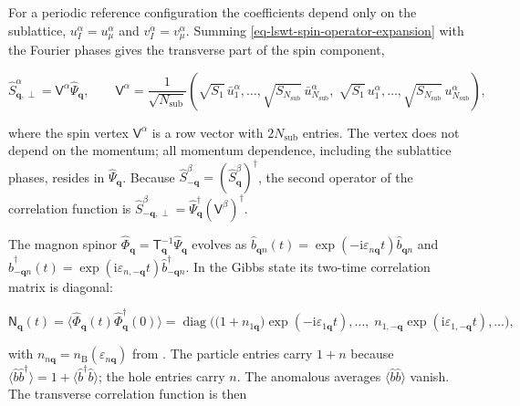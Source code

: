 For a periodic reference configuration the coefficients depend only on the sublattice, \(u_I^\alpha=u_\mu^\alpha\) and \(v_I^\alpha=v_\mu^\alpha\). Summing \eqref{eq-lswt-spin-operator-expansion} with the Fourier phases gives the transverse part of the spin component,

\begin{equation}\label{eq-lswt-spin-vertex}
\hat S_{\mathbf q,\perp}^\alpha=\mathsf V^\alpha\hat\Psi_{\mathbf q},
\qquad
\mathsf V^\alpha=\frac{1}{\sqrt{N_{\mathrm{sub}}}}
\left(\sqrt{S_1}\,\bar u_1^\alpha,\ldots,\sqrt{S_{N_{\mathrm{sub}}}}\,\bar u_{N_{\mathrm{sub}}}^\alpha,\;
\sqrt{S_1}\,u_1^\alpha,\ldots,\sqrt{S_{N_{\mathrm{sub}}}}\,u_{N_{\mathrm{sub}}}^\alpha\right),
\end{equation}

where the spin vertex \(\mathsf V^\alpha\) is a row vector with \(2N_{\mathrm{sub}}\) entries. The vertex does not depend on the momentum; all momentum dependence, including the sublattice phases, resides in \(\hat\Psi_{\mathbf q}\). Because \(\hat S_{-\mathbf q}^\beta=(\hat S_{\mathbf q}^\beta)^\dagger\), the second operator of the correlation function is \(\hat S_{-\mathbf q,\perp}^\beta=\hat\Psi_{\mathbf q}^\dagger(\mathsf V^\beta)^\dagger\).

The magnon spinor \(\hat\Phi_{\mathbf q}=\mathsf T_{\mathbf q}^{-1}\hat\Psi_{\mathbf q}\) evolves as \(\hat b_{\mathbf qn}(t)=\exp(-\mathrm i\varepsilon_{n\mathbf q}t)\hat b_{\mathbf qn}\) and \(\hat b_{-\mathbf qn}^\dagger(t)=\exp(\mathrm i\varepsilon_{n,-\mathbf q}t)\hat b_{-\mathbf qn}^\dagger\). In the Gibbs state its two-time correlation matrix is diagonal:

\begin{equation}\label{eq-lswt-magnon-correlation-matrix}
\mathsf N_{\mathbf q}(t)
=\big\langle\hat\Phi_{\mathbf q}(t)\hat\Phi_{\mathbf q}^\dagger(0)\big\rangle
=\operatorname{diag}\!\Big(\big(1+n_{1\mathbf q}\big)\exp(-\mathrm i\varepsilon_{1\mathbf q}t),\ldots,\;
n_{1,-\mathbf q}\exp(\mathrm i\varepsilon_{1,-\mathbf q}t),\ldots\Big),
\end{equation}

with \(n_{n\mathbf q}=n_{\mathrm B}(\varepsilon_{n\mathbf q})\) from . The particle entries carry \(1+n\) because \(\langle\hat b\hat b^\dagger\rangle=1+\langle\hat b^\dagger\hat b\rangle\); the hole entries carry \(n\). The anomalous averages \(\langle\hat b\hat b\rangle\) vanish. The transverse correlation function is then

